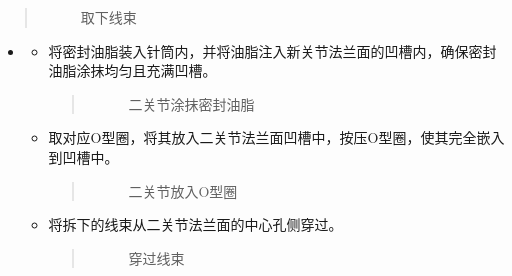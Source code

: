 \documentclass[a4paper,11pt,english,openany,oneside]{sphinxmanual}
\begin{document}
\begin{itemize}
\begin{itemize}
\begin{quote}
\begin{figure}[H]
\centering
\capstart

\noindent{}
\caption{取下线束}\label{\detokenize{_u66f4_u6362_u5173_u8282:id124}}\end{figure}
\end{quote}

\end{itemize}

\end{itemize}

\sphinxAtStartPar
{}
\begin{itemize}
\item {} 
\sphinxAtStartPar
{}
\begin{itemize}
\item {} 
\sphinxAtStartPar
将密封油脂装入针筒内，并将油脂注入新关节法兰面的凹槽内，确保密封油脂涂抹均匀且充满凹槽。
\begin{quote}

\begin{figure}[H]
\centering
\capstart

\noindent{}
\caption{二关节涂抹密封油脂}\label{\detokenize{_u66f4_u6362_u5173_u8282:id125}}\end{figure}
\end{quote}

\item {} 
\sphinxAtStartPar
取对应O型圈，将其放入二关节法兰面凹槽中，按压O型圈，使其完全嵌入到凹槽中。
\begin{quote}

\begin{figure}[H]
\centering
\capstart

\noindent{}
\caption{二关节放入O型圈}\label{\detokenize{_u66f4_u6362_u5173_u8282:id126}}\end{figure}
\end{quote}

\item {} 
\sphinxAtStartPar
将拆下的线束从二关节法兰面的中心孔侧穿过。
\begin{quote}

\begin{figure}[H]
\centering
\capstart

\noindent{}
\caption{穿过线束}\label{\detokenize{_u66f4_u6362_u5173_u8282:id127}}\end{figure}
\end{quote}


\end{itemize}
\end{itemize}
\end{document}
